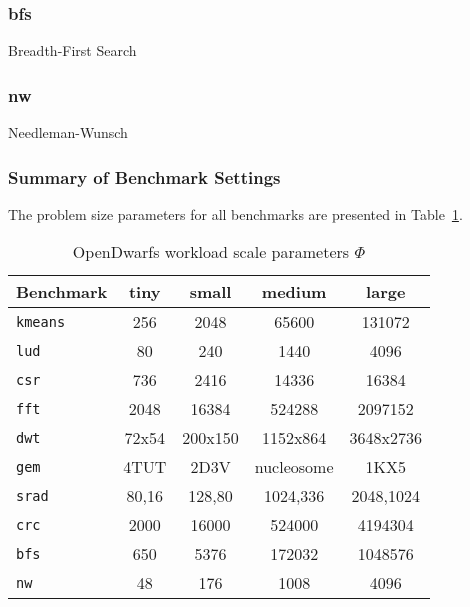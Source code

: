 \documentclass[../document.tex]{subfiles}
\begin{document}
\subsubsection{bfs}
Breadth-First Search

\subsubsection{nw}
Needleman-Wunsch

\subsubsection{Summary of Benchmark Settings}

The problem size parameters for all benchmarks are presented in Table~\ref{tab:problem_sizes}.

\begin{table}[thb]
	\centering
	\begin{threeparttable}
		\centering
		\caption{OpenDwarfs workload scale parameters $\Phi$}
		\begin{tabular}{l|c|c|c|c}
			\bf Benchmark         & \bf tiny   & \bf small  & \bf medium     & \bf large\\\hline
			{\tt kmeans}          & 256        & 2048   & 65600      & 131072\\
			{\tt lud}             & 80         & 240    & 1440       & 4096\\
			{\tt csr}             & 736        & 2416   & 14336      & 16384\\
			{\tt fft}             & 2048       & 16384  & 524288     & 2097152\\
			{\tt dwt}             & 72x54      & 200x150& 1152x864   & 3648x2736\\       
			{\tt gem}             & 4TUT       & 2D3V   & nucleosome & 1KX5\\
			{\tt srad}            & 80,16      & 128,80 & 1024,336   & 2048,1024\\
			{\tt crc}             & 2000       & 16000  & 524000     & 4194304\\
            {\tt bfs}             & 650        & 5376   & 172032     & 1048576\\
            {\tt nw}              & 48         & 176    & 1008       & 4096\\
		\end{tabular}
		\label{tab:problem_sizes}
	\end{threeparttable}
\end{table}
\end{document}
